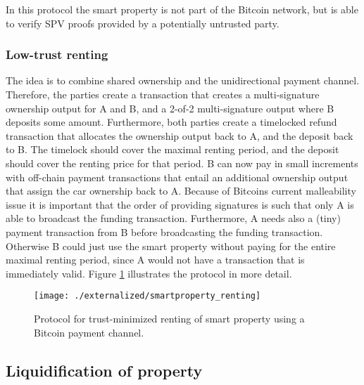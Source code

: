 In this protocol the smart property is not part of the Bitcoin network, but is able to verify SPV proofs provided by a potentially untrusted party. 



\subsubsection{Low-trust renting}

The idea is to combine shared ownership and the unidirectional payment channel. Therefore, the parties create a transaction that creates a multi-signature ownership output for A and B, and a 2-of-2 multi-signature output where B deposits some amount. Furthermore, both parties create a timelocked refund transaction that allocates the ownership output back to A, and the deposit back to B. The timelock should cover the maximal renting period, and the deposit should cover the renting price for that period. B can now pay in small increments with off-chain payment transactions that entail an additional ownership output that assign the car ownership back to A. Because of Bitcoins current malleability issue it is important that the order of providing signatures is such that only A is able to broadcast the funding transaction. Furthermore, A needs also a (tiny) payment transaction from B before broadcasting the funding transaction. Otherwise B could just use the smart property without paying for the entire maximal renting period, since A would not have a transaction that is immediately valid. Figure \ref{fig:smartproperty_renting} illustrates the protocol in more detail.

\begin{figure}[!t]
    \centering
    \texttt{[image: ./externalized/smartproperty\_renting]}
    \caption{Protocol for trust-minimized renting of smart property using a Bitcoin payment channel.}
    \label{fig:smartproperty_renting}
  \end{figure}

\subsection{Liquidification of property}

